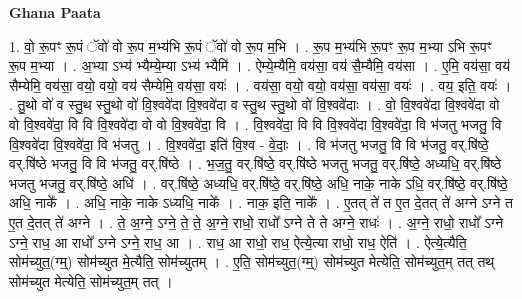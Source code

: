 \documentclass[17pt]{extarticle}
\begin{document}
\textbf{Ghana Paata } \newline

1. वो॒ रू॒पꣳ रू॒पं ॅवो॑ वो रू॒प म॒भ्य॑भि रू॒पं ॅवो॑ वो रू॒प म॒भि । . रू॒प म॒भ्य॑भि रू॒पꣳ रू॒प म॒भ्या ऽभि रू॒पꣳ रू॒प म॒भ्या । . अ॒भ्या ऽभ्य॑ भ्यैम्ये॒म्या ऽभ्य॑ भ्यैमि॑ । . ऐम्ये॒म्यैमि॒ वय॑सा॒ वय॑ सै॒म्यैमि॒ वय॑सा । . ए॒मि॒ वय॑सा॒ वय॑ सैम्येमि॒ वय॑सा॒ वयो॒ वयो॒ वय॑ सैम्येमि॒ वय॑सा॒ वयः॑ । . वय॑सा॒ वयो॒ वयो॒ वय॑सा॒ वय॑सा॒ वयः॑ । . वय॒ इति॒ वयः॑ । . तु॒थो वो॑ व स्तु॒थ स्तु॒थो वो॑ वि॒श्ववे॑दा वि॒श्ववे॑दा व स्तु॒थ स्तु॒थो वो॑ वि॒श्ववे॑दाः । . वो॒ वि॒श्ववे॑दा वि॒श्ववे॑दा वो वो वि॒श्ववे॑दा॒ वि वि वि॒श्ववे॑दा वो वो वि॒श्ववे॑दा॒ वि । . वि॒श्ववे॑दा॒ वि वि वि॒श्ववे॑दा वि॒श्ववे॑दा॒ वि भ॑जतु भजतु॒ वि वि॒श्ववे॑दा वि॒श्ववे॑दा॒ वि भ॑जतु । . वि॒श्ववे॑दा॒ इति॑ वि॒श्व - वे॒दाः॒ । . वि भ॑जतु भजतु॒ वि वि भ॑जतु॒ वर्.षि॑ष्ठे॒ वर्.षि॑ष्ठे भजतु॒ वि वि भ॑जतु॒ वर्.षि॑ष्ठे । . भ॒ज॒तु॒ वर्.षि॑ष्ठे॒ वर्.षि॑ष्ठे भजतु भजतु॒ वर्.षि॑ष्ठे॒ अध्यधि॒ वर्.षि॑ष्ठे भजतु भजतु॒ वर्.षि॑ष्ठे॒ अधि॑ । . वर्.षि॑ष्ठे॒ अध्यधि॒ वर्.षि॑ष्ठे॒ वर्.षि॑ष्ठे॒ अधि॒ नाके॒ नाके ऽधि॒ वर्.षि॑ष्ठे॒ वर्.षि॑ष्ठे॒ अधि॒ नाके᳚ । . अधि॒ नाके॒ नाके ऽध्यधि॒ नाके᳚ । . नाक॒ इति॒ नाके᳚ । . ए॒तत् ते॑ त ए॒त दे॒तत् ते॑ अग्ने ऽग्ने त ए॒त दे॒तत् ते॑ अग्ने । . ते॒ अ॒ग्ने॒ ऽग्ने॒ ते॒ ते॒ अ॒ग्ने॒ राधो॒ राधो᳚ ऽग्ने ते ते अग्ने॒ राधः॑ । . अ॒ग्ने॒ राधो॒ राधो᳚ ऽग्ने ऽग्ने॒ राध॒ आ राधो᳚ ऽग्ने ऽग्ने॒ राध॒ आ । . राध॒ आ राधो॒ राध॒ ऐत्ये॒त्या राधो॒ राध॒ ऐति॑ । . ऐत्ये॒त्यैति॒ सोम॑च्युत॒(ग्म्॒) सोम॑च्युत मे॒त्यैति॒ सोम॑च्युतम् । . ए॒ति॒ सोम॑च्युत॒(ग्म्॒) सोम॑च्युत मेत्येति॒ सोम॑च्युत॒म् तत् तथ् सोम॑च्युत मेत्येति॒ सोम॑च्युत॒म् तत् । \newline
\end{document}
